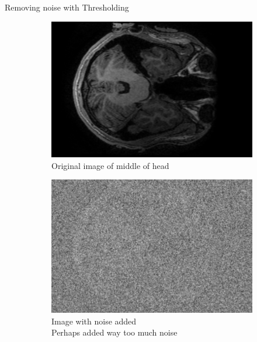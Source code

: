\documentclass[aspectratio=169,xcolor=dvipsnames]{beamer}
\begin{document}
\begin{frame}[fragile]{Removing noise with Thresholding}
		\begin{figure}
			\centering
			\begin{subfigure}[t]{0.3\textwidth}
				\centering
				\includegraphics[width=\linewidth]{BrainScanComparison.png} 
				\caption{Original image of middle of head}
			\end{subfigure}
			\hfill
			\begin{subfigure}[t]{0.3\textwidth}
				\centering
				\includegraphics[width=\linewidth]{NoisyScan.png} 
				\caption{Image with noise added\\ Perhaps added way too much noise}
			\end{subfigure}
			\hfill
			\begin{subfigure}[t]{0.3\textwidth}
				\centering

\end{subfigure}
\end{figure}
\end{frame}
\end{document}
